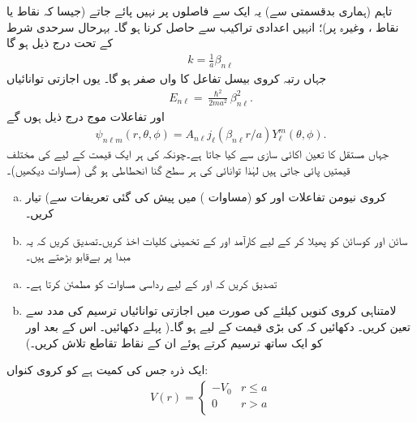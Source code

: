  تاہم (ہماری بدقسمتی سے) یہ ایک سے  فاصلوں پر نہیں پائے جاتے (جیسا کہ نقاط  یا نقاط ، وغیرہ پر)؛ انہیں اعدادی تراکیب سے حاصل کرنا ہو گا۔ بہرحال سرحدی شرط کے تحت درج ذیل ہو گا
\begin{align}
k=\frac{1}{a}\beta_{n\ell} 
\end{align}
جہاں  رتبہ  کروی بیسل تفاعل کا  واں صفر ہو گا۔ یوں اجازتی توانائیاں 
\begin{align}\label{مساوات_ابعاد_کروی_کنواں_اجازتی_توانائیاں}
E_{n\ell}=\frac{\hslash^{2}}{2ma^{2}}\beta_{n\ell}^{2}. 
\end{align}
اور تفاعلات موج درج ذیل ہوں گے 
\begin{align}
\psi_{n\ell m}(r,\theta,\phi)=A_{n\ell}j_{\ell}(\beta_{n\ell}r/a)Y_{\ell}^{m}(\theta,\phi). 
\end{align}
جہاں مستقل  کا تعین اکائی سازی سے کیا جاتا ہے۔چونکہ  کی ہر ایک قیمت کے لیے  کی 
مختلف قیمتیں پائی جاتی ہیں لہٰذا توانائی کی ہر سطح  گنا انحطاطی ہو گی (مساوات  دیکھیں)۔
\begin{enumerate}[a.]
\item
کروی نیومن تفاعلات  اور  کو (مساوات ) میں پیش کی گئی تعریفات سے) تیار کریں۔
\item
سائن اور کوسائن کو پھیلا کر  کے لیے كارآمد  اور  کے تخمینی کلیات اخذ کریں۔تصدیق کریں کہ یہ مبدا پر بےقابو بڑھتے ہیں۔
\end{enumerate}
%
\begin{enumerate}[a.]
\item
 تصدیق کریں کہ  اور  کے لیے  رداسی مساوات کو مطمئن کرتا ہے۔
\item
لامتناہی کروی کنویں کیلئے  کی صورت میں اجازتی توانائیاں ترسیم کی مدد سے تعین کریں۔ دکھائیں کہ  کی بڑی قیمت کے لیے 
 ہو گا۔( پہلے 
 دکھائیں۔ اس کے بعد  اور  کو ایک ساتھ ترسیم کرتے ہوئے ان کے نقاط تقاطع تلاش کریں۔)
\end{enumerate}
%
 ایک ذرہ جس کی کمیت  ہے کو  کروی کنواں:
\begin{align*}
V(r)=\begin{cases}-V_{0}&r\le a\\0&r>a\\\end{cases} 
\end{align*}
